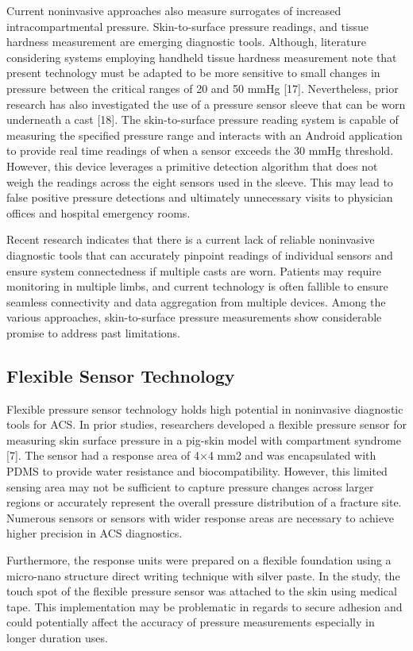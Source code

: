 \documentclass{article}
\begin{document}
Current noninvasive approaches also measure surrogates of increased intracompartmental pressure. Skin-to-surface pressure readings, and tissue hardness measurement are emerging diagnostic tools. Although, literature considering systems employing handheld tissue hardness measurement note that present technology must be adapted to be more sensitive to small changes in pressure between the critical ranges of 20 and 50 mmHg [17]. Nevertheless, prior research has also investigated the use of a pressure sensor sleeve that can be worn underneath a cast [18]. The skin-to-surface pressure reading system is capable of measuring the specified pressure range and interacts with an Android application to provide real time readings of when a sensor exceeds the 30 mmHg threshold. However, this device leverages a primitive detection algorithm that does not weigh the readings across the eight sensors used in the sleeve. This may lead to false positive pressure detections and ultimately unnecessary visits to physician offices and hospital emergency rooms. 

Recent research indicates that there is a current lack of reliable noninvasive diagnostic tools that can accurately pinpoint readings of individual sensors and ensure system connectedness if multiple casts are worn.  Patients may require monitoring in multiple limbs, and current technology is often fallible to ensure seamless connectivity and data aggregation from multiple devices. Among the various approaches, skin-to-surface pressure measurements show considerable promise to address past limitations. 

\subsection{Flexible Sensor Technology}
Flexible pressure sensor technology holds high potential in noninvasive diagnostic tools for ACS.  In prior studies, researchers developed a flexible pressure sensor for measuring skin surface pressure in a pig-skin model with compartment syndrome [7]. The sensor had a response area of 4×4 mm2 and was encapsulated with PDMS to provide water resistance and biocompatibility. However, this limited sensing area may not be sufficient to capture pressure changes across larger regions or accurately represent the overall pressure distribution of a fracture site. Numerous sensors or sensors with wider response areas are necessary to achieve higher precision in ACS diagnostics.
    
Furthermore, the response units were prepared on a flexible foundation using a micro-nano structure direct writing technique with silver paste. In the study, the touch spot of the flexible pressure sensor was attached to the skin using medical tape. This implementation may be problematic in regards to secure adhesion and could potentially affect the accuracy of pressure measurements especially in longer duration uses. 
\end{document}
